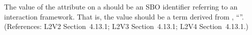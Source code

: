 The value of the  attribute on a \Reaction should
be an SBO identifier referring to an interaction framework.  That
is, the value should be a term derived from \sbointeractionID,
``''.  (References: L2V2 Section~4.13.1; L2V3
Section~4.13.1; L2V4 Section~4.13.1.)
